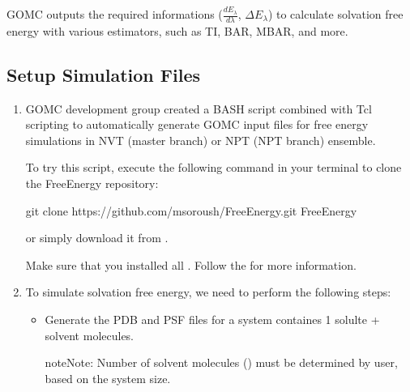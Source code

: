 \documentclass[letterpaper,10pt,english]{sphinxmanual}
\begin{document}
\sphinxAtStartPar
GOMC outputs the required informations (\(\frac{dE_{\lambda}}{d\lambda}\), \(\Delta E_{\lambda}\))
to calculate solvation free energy with various estimators, such as TI, BAR, MBAR, and more.


\subsection{Setup Simulation Files}
\label{\detokenize{howto:setup-simulation-files}}\begin{enumerate}
%
\item {} 
\sphinxAtStartPar
{}

\sphinxAtStartPar
GOMC development group created a BASH script combined with Tcl scripting to automatically
generate GOMC input files for free energy simulations in NVT (master branch) or NPT (NPT branch) ensemble.

\sphinxAtStartPar
To try this script, execute the following command in your terminal to clone the FreeEnergy repository:

\begin{sphinxVerbatim}[commandchars=\\\{\}]
\PYGZdl{} git  clone    https://github.com/msoroush/FreeEnergy.git
\PYGZdl{}    FreeEnergy
\end{sphinxVerbatim}

\sphinxAtStartPar
or simply download it from  .

\sphinxAtStartPar
Make sure that you installed all . Follow the
 for more information.

\item {} 
\sphinxAtStartPar
{}

\sphinxAtStartPar
To simulate solvation free energy, we need to perform the following steps:
\begin{itemize}
\item {} 
\sphinxAtStartPar
Generate the PDB and PSF files for a system containes 1 solulte +  solvent molecules.

\begin{sphinxadmonition}{note}{Note:}
\sphinxAtStartPar
Number of solvent molecules () must be determined by user, based on the system size.
\end{sphinxadmonition}


\end{itemize}
\end{enumerate}
\end{document}
